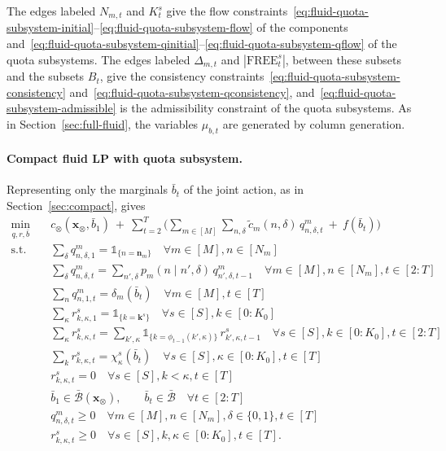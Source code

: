 \documentclass{article}
\begin{document}
The edges labeled $N_{m,t}$ and $K^s_t$ give the flow
constraints~\eqref{eq:fluid-quota-subsystem-initial}--\eqref{eq:fluid-quota-subsystem-flow} of the components
and~\eqref{eq:fluid-quota-subsystem-qinitial}--\eqref{eq:fluid-quota-subsystem-qflow} of the quota subsystems. The
edges labeled $\Delta_{m,t}$ and $|\text{FREE}^s_t|$, between these subsets and the subsets $B_t$, give the consistency
constraints~\eqref{eq:fluid-quota-subsystem-consistency} and~\eqref{eq:fluid-quota-subsystem-qconsistency},
and~\eqref{eq:fluid-quota-subsystem-admissible} is the admissibility constraint of the quota subsystems. As in
Section~\ref{sec:full-fluid}, the variables $\mu_{b,t}$ are generated by column generation.

\paragraph{Compact fluid LP with quota subsystem.} Representing only the marginals $\bar b_t$ of the joint action, as in
Section~\ref{sec:compact}, gives
\begin{subequations}\label{eq:compact-light}
\begin{align}
\min_{q,r,\bar b} \quad
& c_\otimes(\mathbf{x}_\otimes, \bar b_1) \ +\ \sum_{t=2}^{T} \Bigg( \sum_{m \in [M]} \sum_{n,\delta} \tilde
c_m(n,\delta)\,q^m_{n,\delta,t} \ +\ f(\bar b_t) \Bigg)
\label{eq:compact-light-obj}\\
\text{s.t.} \quad
& \sum_{\delta} q^m_{n,\delta,1} = \mathds{1}_{\{n = \mathbf{n}_m\}} \quad \forall m \in [M], n \in [N_m]
\label{eq:compact-light-initial}\\
& \sum_{\delta} q^m_{n,\delta,t} = \sum_{n',\delta} p_m(n \mid n',\delta)\, q^m_{n',\delta,t-1}
\quad \forall m \in [M], n \in [N_m], t \in [2:T]
\label{eq:compact-light-flow}\\
& \sum_{n} q^m_{n,1,t} = \delta_m(\bar b_t) \quad \forall m \in [M], t \in [T]
\label{eq:compact-light-consistency}\\
& \sum_\kappa r^s_{k,\kappa,1} = \mathds{1}_{\{k = \mathbf{k}^s\}} \quad \forall s \in [S], k \in [0:K_0]
\label{eq:compact-light-qinitial}\\
& \sum_\kappa r^s_{k,\kappa,t} = \sum_{k',\kappa} \mathds{1}_{\{k=\phi_{t-1}(k',\kappa)\}}\, r^s_{k',\kappa,t-1}
\quad \forall s \in [S], k \in [0:K_0], t \in [2:T]
\label{eq:compact-light-qflow}\\
& \sum_{k} r^s_{k,\kappa,t} = \chi^s_\kappa(\bar b_t) \quad \forall s \in [S], \kappa \in
[0:K_0], t \in [T]
\label{eq:compact-light-qconsistency}\\
& r^s_{k,\kappa,t} = 0 \quad \forall s \in [S], k < \kappa, t \in [T]
\label{eq:compact-light-admissible}\\
& \bar b_1 \in \bar{\mathcal{B}}(\mathbf{x}_\otimes), \qquad \bar b_t \in \bar{\mathcal{B}} \quad \forall t \in [2:T]
\label{eq:compact-light-b}\\
& q^m_{n,\delta,t} \ge 0 \quad \forall m \in [M], n \in [N_m], \delta \in \{0,1\}, t \in [T]
\nonumber\\
& r^s_{k,\kappa,t} \ge 0 \quad \forall s \in [S], k, \kappa \in [0:K_0], t \in [T].
\label{eq:compact-light-nonneg}
\end{align}
\end{subequations}
\end{document}
